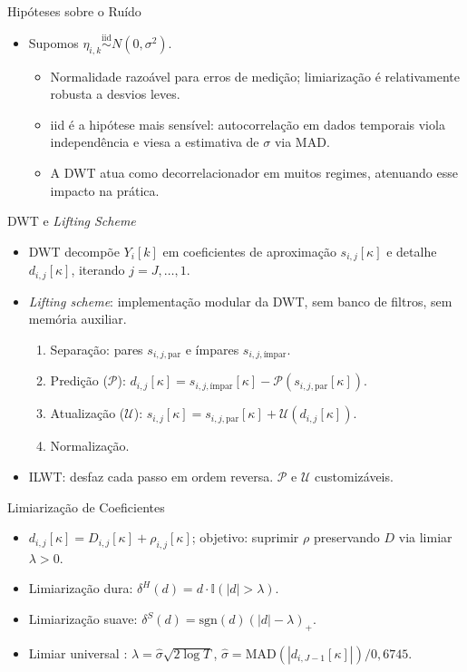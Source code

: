 \documentclass{beamer}
\begin{document}
\begin{frame}{Hipóteses sobre o Ruído}
\begin{itemize}
    \item Supomos \(\eta_{i,k} \overset{\mathrm{iid}}{\sim} N(0, \sigma^2)\).
    \begin{itemize}
        \item Normalidade razoável para erros de medição; limiarização é relativamente robusta a desvios leves.
        \item iid é a hipótese mais sensível: autocorrelação em dados temporais viola independência e viesa a estimativa de \(\sigma\) via MAD.
        \item A DWT atua como decorrelacionador em muitos regimes, atenuando esse impacto na prática.
    \end{itemize}
\end{itemize}
\end{frame}

\begin{frame}{DWT e \textit{Lifting Scheme}}
\begin{itemize}
    \item DWT decompõe \(Y_i[k]\) em coeficientes de aproximação \(s_{i,j}[\kappa]\) e detalhe \(d_{i,j}[\kappa]\), iterando \(j = J, \ldots, 1\).
    \item \textit{Lifting scheme}: implementação modular da DWT, sem banco de filtros, sem memória auxiliar.
    \begin{enumerate}
        \item Separação: pares \(s_{i,j,\text{par}}\) e ímpares \(s_{i,j,\text{ímpar}}\).
        \item Predição (\(\mathcal{P}\)): \(d_{i,j}[\kappa] = s_{i,j,\text{ímpar}}[\kappa] - \mathcal{P}(s_{i,j,\text{par}}[\kappa])\).
        \item Atualização (\(\mathcal{U}\)): \(s_{i,j}[\kappa] = s_{i,j,\text{par}}[\kappa] + \mathcal{U}(d_{i,j}[\kappa])\).
        \item Normalização.
    \end{enumerate}
    \item ILWT: desfaz cada passo em ordem reversa. \(\mathcal{P}\) e \(\mathcal{U}\) customizáveis.
\end{itemize}
\end{frame}

\begin{frame}{Limiarização de Coeficientes}
\begin{itemize}
    \item \(d_{i,j}[\kappa] = D_{i,j}[\kappa] + \rho_{i,j}[\kappa]\); objetivo: suprimir \(\rho\) preservando \(D\) via limiar \(\lambda > 0\).
    \medskip
    \item Limiarização dura: \(\delta^H(d) = d \cdot \mathbb{I}(|d| > \lambda)\).
    \item Limiarização suave: \(\delta^S(d) = \mathrm{sgn}(d)(|d| - \lambda)_+\).
    \item Limiar universal \cite{donoho_ideal_1994}: \(\lambda = \hat{\sigma}\sqrt{2\log T}\), \(\hat{\sigma} = \mathrm{MAD}(|d_{i,J-1}[\kappa]|)/0{,}6745\).
\end{itemize}
\end{frame}
\end{document}
